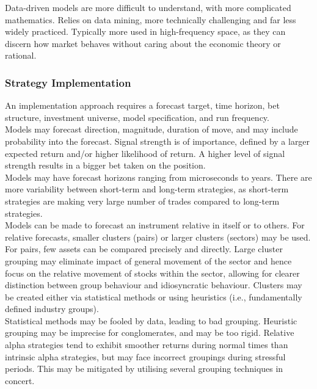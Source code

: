Data-driven models are more difficult to understand, with more complicated mathematics. Relies on data mining, more technically challenging and far less widely practiced. Typically more used in high-frequency space, as they can discern how market behaves without caring about the economic theory or rational.

\subsubsection{Strategy Implementation}

An implementation approach requires a forecast target, time horizon, bet structure, investment universe, model specification, and run frequency.\\

 Models may forecast direction, magnitude, duration of move, and may include probability into the forecast. Signal strength is of importance, defined by a larger expected return and/or higher likelihood of return. A higher level of signal strength results in a bigger bet taken on the position.\\

 Models may have forecast horizons ranging from microseconds to years. There are more variability between short-term and long-term strategies, as short-term strategies are making very large number of trades compared to long-term strategies.\\

 Models can be made to forecast an instrument relative in itself or to others. For relative forecasts, smaller clusters (pairs) or larger clusters (sectors) may be used. For pairs, few assets can be compared precisely and directly. Large cluster grouping may eliminate impact of general movement of the sector and hence focus on the relative movement of stocks within the sector, allowing for clearer distinction between group behaviour and idiosyncratic behaviour. Clusters may be created either via statistical methods or using heuristics (i.e., fundamentally defined industry groups).\\
Statistical methods may be fooled by data, leading to bad grouping. Heuristic grouping may be imprecise for conglomerates, and may be too rigid. Relative alpha strategies tend to exhibit smoother returns during normal times than intrinsic alpha strategies, but may face incorrect groupings during stressful periods. This may be mitigated by utilising several grouping techniques in concert.\\

